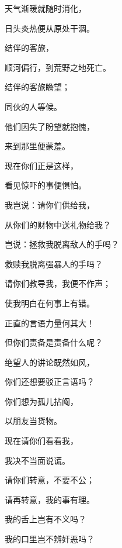 {\par }{\Q {}天气渐暖就随时消化，
\par }{\Q 日头炎热便从原处干涸。
\par }{\Q {}结伴的客旅{}，
\par }{\Q 顺河偏行，到荒野之地死亡。
\par }{\Q {}结伴的客旅瞻望；
\par }{同伙的人等候。
\par }{\Q {}他们因失了盼望就抱愧，
\par }{\Q 来到那里便蒙羞。
\par }{\Q {}现在你们正是这样，
\par }{\Q 看见惊吓的事便惧怕。
\par }{\Q {}我岂说：请你们供给我，
\par }{\Q 从你们的财物中送礼物给我？
\par }{\Q {}岂说：拯救我脱离敌人的手吗？
\par }{\Q 救赎我脱离强暴人的手吗？
\par }{\BB \par }{\Q {}请你们教导我，我便不作声；
\par }{\Q 使我明白在何事上有错。
\par }{\Q {}正直的言语力量何其大！
\par }{\Q 但你们责备是责备什么呢？
\par }{\Q {}绝望人的讲论既然如风，
\par }{\Q 你们还想要驳正言语吗？
\par }{\Q {}你们想为孤儿拈阄，
\par }{\Q 以朋友当货物。
\par }{\BB \par }{\Q {}现在请你们看看我，
\par }{\Q 我决不当面说谎。
\par }{\Q {}请你们转意，不要不公；
\par }{\Q 请再转意，我的事有理。
\par }{\Q {}我的舌上岂有不义吗？
\par }{\Q 我的口里岂不辨奸恶吗？

}
